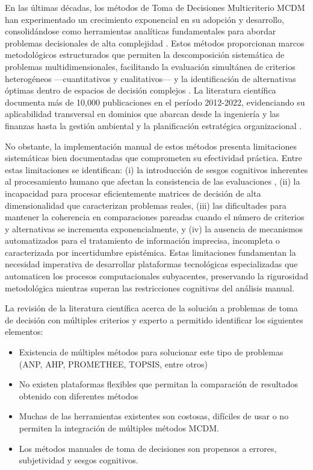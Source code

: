 En las últimas décadas, los métodos de Toma de Decisiones Multicriterio \ac{MCDM} han experimentado un crecimiento exponencial en su adopción y desarrollo, consolidándose como herramientas analíticas fundamentales para abordar problemas decisionales de alta complejidad \citep{thomas2023}. Estos métodos proporcionan marcos metodológicos estructurados que permiten la descomposición sistemática de problemas multidimensionales, facilitando la evaluación simultánea de criterios heterogéneos —cuantitativos y cualitativos— y la identificación de alternativas óptimas dentro de espacios de decisión complejos \citep{cinelli2021}. La literatura científica documenta más de 10,000 publicaciones en el período 2012-2022, evidenciando su aplicabilidad transversal en dominios que abarcan desde la ingeniería y las finanzas hasta la gestión ambiental y la planificación estratégica organizacional \citep{thomas2023}. 

No obstante, la implementación manual de estos métodos presenta limitaciones sistemáticas bien documentadas que comprometen su efectividad práctica. Entre estas limitaciones se identifican: (i) la introducción de sesgos cognitivos inherentes al procesamiento humano que afectan la consistencia de las evaluaciones \citep{berthet2021}, (ii) la incapacidad para procesar eficientemente matrices de decisión de alta dimensionalidad que caracterizan problemas reales, (iii) las dificultades para mantener la coherencia en comparaciones pareadas cuando el número de criterios y alternativas se incrementa exponencialmente, y (iv) la ausencia de mecanismos automatizados para el tratamiento de información imprecisa, incompleta o caracterizada por incertidumbre epistémica. Estas limitaciones fundamentan la necesidad imperativa de desarrollar plataformas tecnológicas especializadas que automaticen los procesos computacionales subyacentes, preservando la rigurosidad metodológica mientras superan las restricciones cognitivas del análisis manual.

La revisión de la literatura científica acerca de la solución a problemas de toma de decisión con múltiples criterios y experto a permitido identificar los siguientes elementos:

\begin{itemize}
	\item Existencia de múltiples métodos para solucionar este tipo de problemas (ANP, AHP, PROMETHEE, TOPSIS, entre otros)
	\item No existen plataformas flexibles que permitan la comparación de resultados obtenido con diferentes métodos
	\item Muchas de las herramientas existentes son costosas, difíciles de usar o no permiten la integración de múltiples métodos MCDM.
	\item Los métodos manuales de toma de decisiones son propensos a errores, subjetividad y sesgos cognitivos.
\end{itemize}

